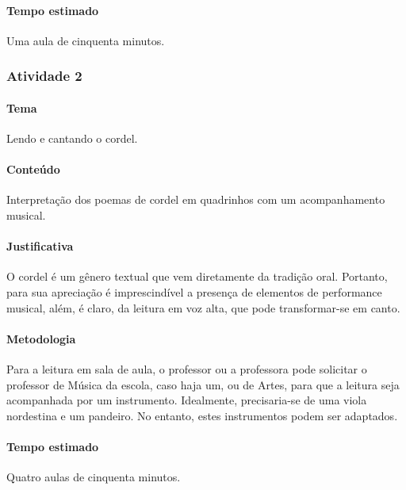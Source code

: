 \documentclass[11pt]{extarticle}
\begin{document}
\paragraph{Tempo estimado} Uma aula de cinquenta minutos.



\pagebreak

\subsubsection{Atividade 2}


\paragraph{Tema} Lendo e cantando o cordel. 


\paragraph{Conteúdo} Interpretação dos poemas de cordel em quadrinhos com um
acompanhamento musical.

\paragraph{Justificativa} O cordel é um gênero textual que vem diretamente da
tradição oral. Portanto, para sua apreciação é imprescindível 
a presença de elementos de performance musical, além, é claro, da leitura
em voz alta, que pode transformar-se em canto.

\paragraph{Metodologia} Para a leitura em sala de aula, o professor ou a professora pode solicitar o
professor de Música da escola, caso haja um, ou de Artes, para que a leitura
seja acompanhada por um instrumento. Idealmente, precisaria-se de uma viola nordestina 
e um pandeiro. No entanto, estes instrumentos podem ser adaptados. 


\paragraph{Tempo estimado} Quatro aulas de cinquenta minutos.
\end{document}
